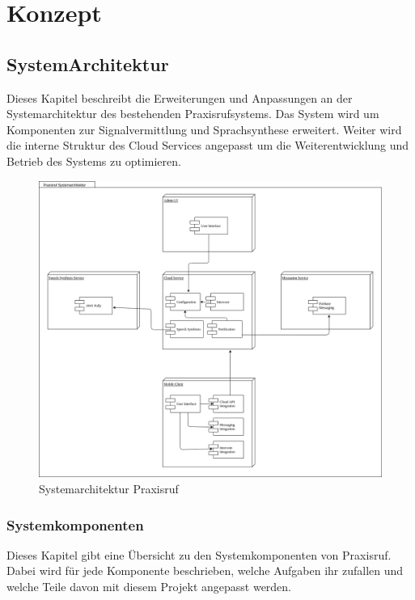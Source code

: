\section{Konzept}

\subsection{SystemArchitektur}

Dieses Kapitel beschreibt die Erweiterungen und Anpassungen an der Systemarchitektur des bestehenden Praxisrufsystems.
Das System wird um Komponenten zur Signalvermittlung und Sprachsynthese erweitert.
Weiter wird die interne Struktur des Cloud Services angepasst um die Weiterentwicklung und Betrieb des Systems zu optimieren.

\begin{figure}[h]
    \centering
    \begin{minipage}[b]{0.75\textwidth}
        \includegraphics[width=\textwidth]{graphics/diagramms/Component_System_V01}
        \caption{Systemarchitektur Praxisruf}
    \end{minipage}
\end{figure}

\subsubsection{Systemkomponenten}

Dieses Kapitel gibt eine Übersicht zu den Systemkomponenten von Praxisruf.
Dabei wird für jede Komponente beschrieben, welche Aufgaben ihr zufallen und welche Teile davon mit diesem Projekt angepasst werden.

